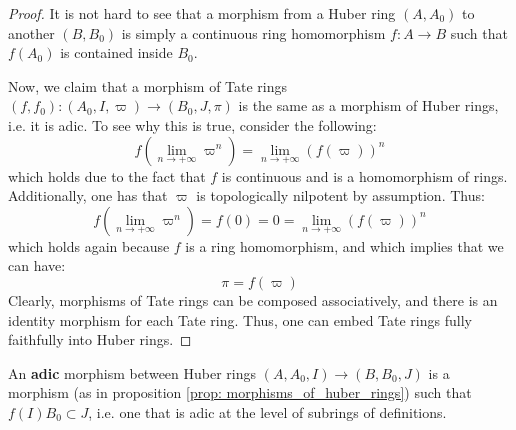                 \begin{proof}
                    It is not hard to see that a morphism from a Huber ring $(A, A_0)$ to another $(B, B_0)$ is simply a continuous ring homomorphism $f: A \to B$ such that $f(A_0)$ is contained inside $B_0$. 
                    
                    Now, we claim that a morphism of Tate rings $(f, f_0): (A_0, I, \varpi) \to (B_0, J, \pi)$ is the same as a morphism of Huber rings, i.e. it is adic. To see why this is true, consider the following:
                        $$f\left(\underset{n \to +\infty}{\lim} \varpi^n \right) = \underset{n \to +\infty}{\lim} (f(\varpi))^n$$
                    which holds due to the fact that $f$ is continuous and is a homomorphism of rings. Additionally, one has that $\varpi$ is topologically nilpotent by assumption. Thus:
                        $$f\left(\underset{n \to +\infty}{\lim} \varpi^n \right) = f(0) = 0 = \underset{n \to +\infty}{\lim} (f(\varpi))^n$$
                    which holds again because $f$ is a ring homomorphism, and which implies that we can have:
                        $$\pi = f(\varpi)$$
                    Clearly, morphisms of Tate rings can be composed associatively, and there is an identity morphism for each Tate ring. Thus, one can embed Tate rings fully faithfully into Huber rings.
                \end{proof}
            
            \begin{definition} \label{def: adic_morphisms}
                An \textbf{adic} morphism between Huber rings $(A, A_0, I) \to (B, B_0, J)$ is a morphism (as in proposition \ref{prop: morphisms_of_huber_rings}) such that $f(I)B_0 \subset J$, i.e. one that is adic at the level of subrings of definitions.
            \end{definition}
            
